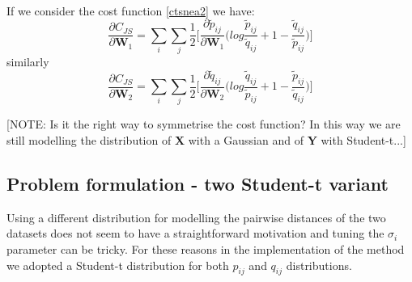 \documentclass[11pt]{article}
\begin{document}
\\
If we consider the cost function \ref{ctsnea2} we have:
\begin{equation}
\frac{\partial C_{JS}}{\partial \mathbf{W}_1}=\sum_i \sum_j \frac{1}{2}\Big[ \frac{\partial\tilde{p}_{ij}}{\partial \mathbf{W}_1} \Big( log \frac{\tilde{p}_{ij}}{\tilde{q}_{ij}} + 1 - \frac{\tilde{q}_{ij}}{\tilde{p}_{ij}}\Big) \Big]
\end{equation}
similarly
\begin{equation}
\frac{\partial C_{JS}}{\partial \mathbf{W}_2}=\sum_i \sum_j \frac{1}{2}\Big[ \frac{\partial\tilde{q}_{ij}}{\partial \mathbf{W}_2} \Big( log \frac{\tilde{q}_{ij}}{\tilde{p}_{ij}} + 1 - \frac{\tilde{p}_{ij}}{\tilde{q}_{ij}}\Big) \Big]\end{equation}

[NOTE: Is it the right way to symmetrise the cost function? In this way we are still modelling the distribution of $\mathbf{X}$ with a Gaussian and of $\mathbf{Y}$ with Student-t...]

\subsection{Problem formulation - two Student-t variant}
Using a different distribution for modelling the pairwise distances of the two datasets does not seem to have a straightforward motivation and tuning the $\sigma_i$ parameter can be tricky. For these reasons in the implementation of the method we adopted a Student-t distribution for both $p_{ij}$ and $q_{ij}$ distributions.
\end{document}
